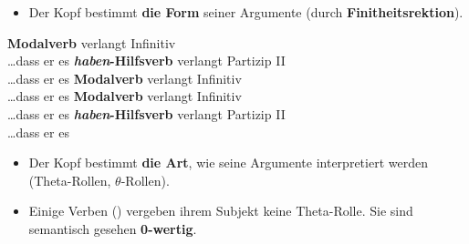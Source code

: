 \begin{frame}

\begin{itemize}
	\item Der Kopf bestimmt \textbf{die Form} seiner Argumente (\zB durch \textbf{Finitheitsrektion}).
\end{itemize}

\ea \textbf{Modalverb} verlangt Infinitiv\\
\dots dass er es 
\pause
\ex \textbf{\emph{haben}-Hilfsverb} verlangt Partizip II\\
\dots dass er es 
\pause
\ex \textbf{Modalverb} verlangt Infinitiv\\
\dots dass er es 
\pause
\ex \textbf{Modalverb} verlangt Infinitiv\\
\dots dass er es 
\pause
\ex \textbf{\emph{haben}-Hilfsverb} verlangt Partizip II\\
\dots dass er es 
\z

\end{frame}


\begin{frame}

\begin{itemize}
	\item Der Kopf bestimmt \textbf{die Art}, wie seine Argumente interpretiert werden (Theta-Rollen, $\theta$-Rollen).

\eal 
{}
\zl

\eal
{}
\zl


	\item Einige Verben (\zB {}) vergeben ihrem Subjekt keine Theta-Rolle. Sie sind semantisch gesehen \textbf{0-wertig}.

\end{itemize}

\end{frame}


